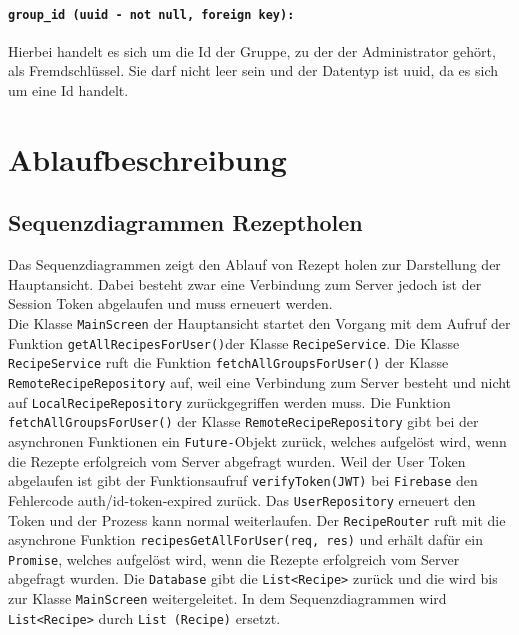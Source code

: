 \documentclass{entwurfsheft}
\begin{document}
\paragraph{\texttt{group\_id (uuid - not null, foreign key):}} Hierbei handelt es sich um die Id der Gruppe, zu der der Administrator gehört, als Fremdschlüssel. Sie darf nicht leer sein und der Datentyp ist \Gls{uuid}, da es sich um eine Id handelt.
\newpage

\section{Ablaufbeschreibung}
    \subsection{Sequenzdiagrammen Rezeptholen}
            Das Sequenzdiagrammen zeigt den Ablauf von Rezept holen zur Darstellung der Hauptansicht. Dabei besteht zwar eine Verbindung zum Server jedoch ist der Session Token abgelaufen und muss erneuert werden.\\
            Die Klasse \texttt{MainScreen} der Hauptansicht startet den Vorgang mit dem Aufruf der Funktion \texttt{getAllRecipesForUser()}der Klasse \texttt{RecipeService}. Die Klasse \texttt{RecipeService} ruft die Funktion \texttt{fetchAllGroupsForUser()} der Klasse \texttt{RemoteRecipeRepository} auf, weil eine Verbindung zum Server besteht und nicht auf \texttt{LocalRecipeRepository} zurückgegriffen werden muss. Die Funktion \texttt{fetchAllGroupsForUser()} der Klasse \texttt{RemoteRecipeRepository} gibt bei der asynchronen Funktionen ein \texttt{Future-}Objekt zurück, welches aufgelöst wird, wenn die Rezepte erfolgreich vom Server abgefragt wurden. Weil der User Token abgelaufen ist gibt der Funktionsaufruf \texttt{verifyToken(JWT)} bei \texttt{Firebase} den Fehlercode auth\slash id-token-expired zurück. Das \texttt{UserRepository} erneuert den Token und der Prozess kann normal weiterlaufen. Der \texttt{RecipeRouter} ruft mit die asynchrone Funktion \texttt{recipesGetAllForUser(req, res)} und erhält dafür ein \texttt{Promise}, welches aufgelöst wird, wenn die Rezepte erfolgreich vom Server abgefragt wurden. Die \texttt{Database} gibt die \texttt{List<Recipe>} zurück und die wird bis zur Klasse \texttt{MainScreen} weitergeleitet. In dem Sequenzdiagrammen wird \texttt{List<Recipe>} durch \texttt{List (Recipe)} ersetzt.
        
\end{document}
